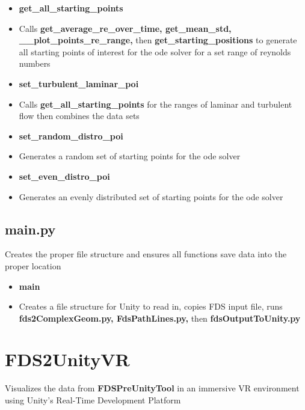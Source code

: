 \begin{itemize}
    \item \textbf{get\_all\_starting\_points}
    \item[] Calls \textbf{get\_average\_re\_over\_time, get\_mean\_std, \_\_plot\_points\_re\_range,} then \textbf{get\_starting\_positions} to generate all starting points of interest for the ode solver for a set range of reynolds numbers
    
    \item \textbf{set\_turbulent\_laminar\_poi}
    \item[] Calls \textbf{get\_all\_starting\_points} for the ranges of laminar and turbulent flow then combines the data sets
    
    \item \textbf{set\_random\_distro\_poi}
    \item[] Generates a random set of starting points for the ode solver
    
    \item \textbf{set\_even\_distro\_poi}
    \item[] Generates an evenly distributed set of starting points for the ode solver

\end{itemize}
\pagebreak
\subsection{main.py}
\label{PythonMain}
Creates the proper file structure and ensures all functions save data into the proper location  
\begin{itemize}
    \item \textbf{main}
    \item[] Creates a file structure for Unity to read in, copies FDS input file, runs \textbf{fds2ComplexGeom.py, FdsPathLines.py,} then \textbf{fdsOutputToUnity.py} 
    
\end{itemize}
\break

\section{FDS2UnityVR}
Visualizes the data from \textbf{FDSPreUnityTool} in an immersive VR environment using Unity's Real-Time Development Platform    
